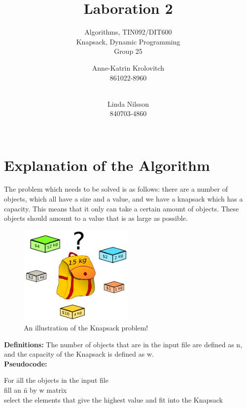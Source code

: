 \documentclass{inc/mas}
\title{Laboration 2 }
\subtitle{Algorithms, TIN092/DIT600\\ Knapsack, Dynamic Programming \\ Group 25}
\affiliation{}
\begin{document}
\author{Anne-Katrin Krolovitch \\ 861022-8960\\ \\ \and
Linda Nilsson \\ 840703-4860 \\ \\ \tabularnewline
}
\maketitle
\section{Explanation of the Algorithm} 
 \noindent The problem which needs to be solved is as follows: there are a number of objects, which all have a size and a value, and we have a knapsack which has a capacity. This means that it only can take a certain amount of objects. These objects should amount to a value that is as large as possible.\\

\begin{figure}[h!]
  \centering
      \includegraphics[width=0.5\textwidth]{Knapsack.png}
  \caption{An illustration of the Knapsack problem! \citep{wikipic} }
\end{figure}



\textbf{Definitions:} The number of objects that are in the input file are defined as n, and the capacity of the Knapsack is defined as w.\\

\noindent \textbf{Pseudocode:}
\begin{tabbing}
For \= all the objects in the input file \\
\> fill an \= n by w matrix	\\
\> select the elements that give the highest value and fit into the Knapsack\\
\end{tabbing}
\end{document}

